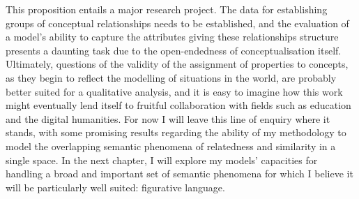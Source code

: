This proposition entails a major research project.  The data for establishing groups of conceptual relationships needs to be established, and the evaluation of a model's ability to capture the attributes giving these relationships structure presents a daunting task due to the open-endedness of conceptualisation itself.  Ultimately, questions of the validity of the assignment of properties to concepts, as they begin to reflect the modelling of situations in the world, are probably better suited for a qualitative analysis, and it is easy to imagine how this work might eventually lend itself to fruitful collaboration with fields such as education and the digital humanities.  For now I will leave this line of enquiry where it stands, with some promising results regarding the ability of my methodology to model the overlapping semantic phenomena of relatedness and similarity in a single space.  In the next chapter, I will explore my models' capacities for handling a broad and important set of semantic phenomena for which I believe it will be particularly well suited: figurative language.

